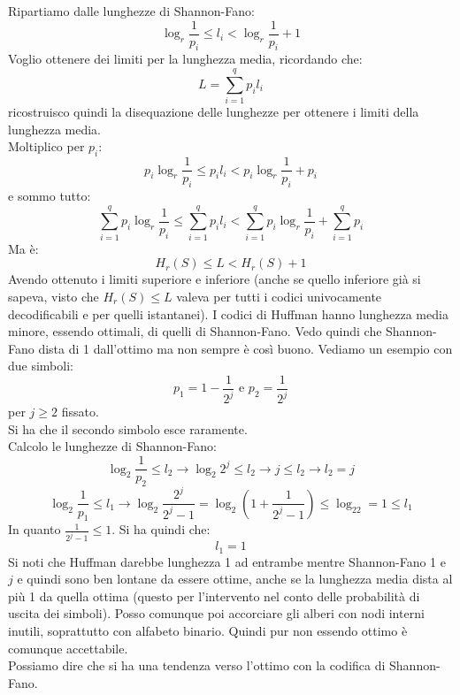 \documentclass[a4paper,12pt, oneside]{book}
\begin{document}
Ripartiamo dalle lunghezze di Shannon-Fano:
\[\log_r \frac{1}{p_i}\leq l_i< \log_r\frac{1}{p_i}+1\]
Voglio ottenere dei limiti per la lunghezza media, ricordando che:
\[L=\sum_{i=1}^q p_il_i\]
ricostruisco quindi la disequazione delle lunghezze per ottenere i limiti della
lunghezza media.\\
Moltiplico per $p_i$:
\[p_i\log_r \frac{1}{p_i}\leq p_il_i<p_i \log_r\frac{1}{p_i}+p_i\]
e sommo tutto:
\[\sum_{i=1}^qp_i\log_r \frac{1}{p_i}\leq \sum_{i=1}^qp_il_i<\sum_{i=1}^qp_i
  \log_r\frac{1}{p_i}+\sum_{i=1}^q p_i\] 
Ma è:
\[H_r(S)\leq L< H_r(S)+1\]
Avendo ottenuto i limiti superiore e inferiore (anche se quello inferiore già si
sapeva, visto che $H_r(S)\leq L$ valeva per tutti i codici univocamente
decodificabili e per quelli istantanei). I codici di Huffman hanno lunghezza
media minore, essendo ottimali, di quelli di Shannon-Fano. Vedo quindi che
Shannon-Fano dista di 1 dall'ottimo ma non sempre è così buono. Vediamo un
esempio con due simboli:
\[p_1=1-\frac{1}{2^j}\mbox{ e }p_2=\frac{1}{2^j}\]
per $j\geq 2$ fissato.\\
Si ha che il secondo simbolo esce raramente.\\
Calcolo le lunghezze di Shannon-Fano:
\[\log_2\frac{1}{p_2}\leq l_2\to \log_2 2^j\leq l_2\to j\leq l_2\to l_2=j\]
\[\log_2\frac{1}{p_1}\leq l_1\to\log_2\frac{2^j}{2^j-1}=\log_2\left( 1+
    \frac{1}{2^j-1}\right)\leq \log_22=1\leq l_1\]
In quanto $\frac{1}{2^j-1}\leq 1$. Si ha quindi che:
\[l_1=1\]
Si noti che Huffman darebbe lunghezza 1 ad entrambe mentre Shannon-Fano 1 e $j$
e quindi sono ben lontane da essere ottime, anche se la lunghezza media dista al
più 1 da quella ottima (questo per l'intervento nel conto delle probabilità di
uscita dei simboli). Posso comunque poi accorciare gli alberi con nodi interni
inutili, soprattutto con alfabeto binario. Quindi pur non essendo ottimo è
comunque accettabile.\\ 
Possiamo dire che si ha una tendenza verso l'ottimo con la codifica di
Shannon-Fano.
\end{document}

